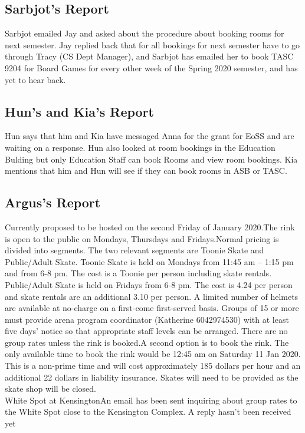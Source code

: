 \documentclass[12pt]{article}
\begin{document}
\subsection{Sarbjot's Report}
\noindent Sarbjot emailed Jay and asked about the procedure about booking rooms for next semester. Jay replied back that for all bookings for next semester have to go through Tracy (CS Dept Manager), and Sarbjot has emailed her to book TASC 9204 for Board Games for every other week of the Spring 2020 semester, and has yet to hear back.

\subsection{Hun's and Kia's Report}
\noindent Hun says that him and Kia have messaged Anna for the grant for EoSS and are waiting on a response. Hun also looked at room bookings in the Education Bulding but only Education Staff can book Rooms and view room bookings. Kia mentions that him and Hun will see if they can book rooms in ASB or TASC.

\subsection{Argus's Report}
\noindent Currently proposed to be hosted on the second Friday of January 2020.The rink is open to the public on Mondays, Thursdays and Fridays.Normal pricing is divided into segments.  The two relevant segments are Toonie Skate and Public/Adult Skate.  Toonie Skate is held on Mondays from 11:45 am – 1:15 pm and from 6-8 pm.  The cost is a Toonie per person including skate rentals.  Public/Adult Skate is held on Fridays from 6-8 pm. The cost is 4.24 per person and skate rentals are an additional 3.10 per person.  A limited number of helmets are available at no-charge on a first-come first-served basis.  Groups of 15 or more must provide arena program coordinator (Katherine 6042974530) with at least five days’ notice so that appropriate staff levels can be arranged.  There are no group rates unless the rink is booked.A second option is to book the rink.  The only available time to book the rink would be 12:45 am on Saturday 11 Jan 2020.  This is a non-prime time and will cost approximately 185 dollars per hour and an additional 22 dollars in liability insurance.  Skates will need to be provided as the skate shop will be closed. \\ 

\noindent White Spot at KensingtonAn email has been sent inquiring about group rates to the White Spot close to the Kensington Complex.  A reply hasn’t been received yet
\end{document}
